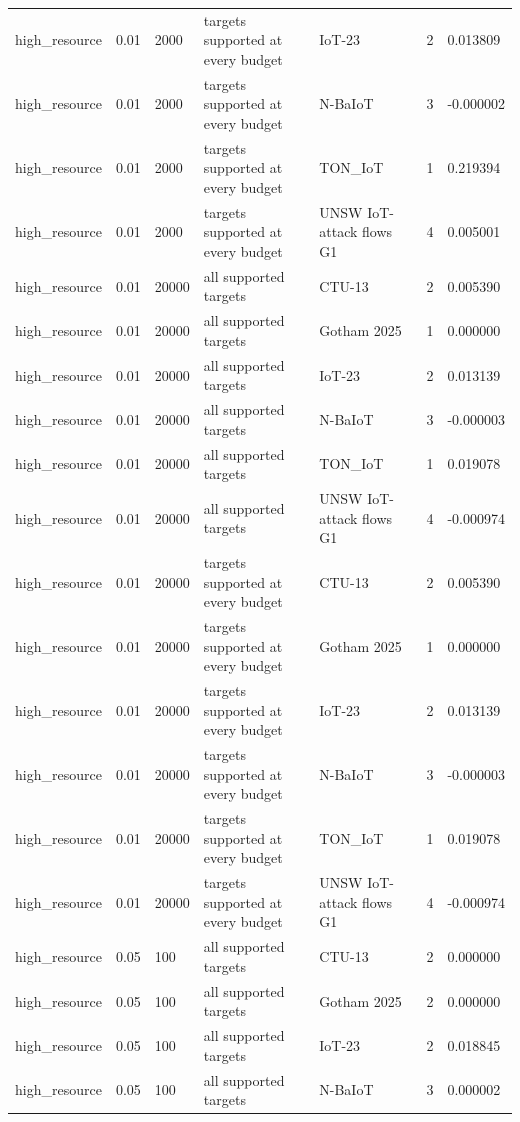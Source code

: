 \begin{tabular}{lllllll}
high\_resource & 0.01 & 2000 & targets supported at every budget & IoT-23 & 2 & 0.013809 \\
high\_resource & 0.01 & 2000 & targets supported at every budget & N-BaIoT & 3 & -0.000002 \\
high\_resource & 0.01 & 2000 & targets supported at every budget & TON\_IoT & 1 & 0.219394 \\
high\_resource & 0.01 & 2000 & targets supported at every budget & UNSW IoT-attack flows G1 & 4 & 0.005001 \\
high\_resource & 0.01 & 20000 & all supported targets & CTU-13 & 2 & 0.005390 \\
high\_resource & 0.01 & 20000 & all supported targets & Gotham 2025 & 1 & 0.000000 \\
high\_resource & 0.01 & 20000 & all supported targets & IoT-23 & 2 & 0.013139 \\
high\_resource & 0.01 & 20000 & all supported targets & N-BaIoT & 3 & -0.000003 \\
high\_resource & 0.01 & 20000 & all supported targets & TON\_IoT & 1 & 0.019078 \\
high\_resource & 0.01 & 20000 & all supported targets & UNSW IoT-attack flows G1 & 4 & -0.000974 \\
high\_resource & 0.01 & 20000 & targets supported at every budget & CTU-13 & 2 & 0.005390 \\
high\_resource & 0.01 & 20000 & targets supported at every budget & Gotham 2025 & 1 & 0.000000 \\
high\_resource & 0.01 & 20000 & targets supported at every budget & IoT-23 & 2 & 0.013139 \\
high\_resource & 0.01 & 20000 & targets supported at every budget & N-BaIoT & 3 & -0.000003 \\
high\_resource & 0.01 & 20000 & targets supported at every budget & TON\_IoT & 1 & 0.019078 \\
high\_resource & 0.01 & 20000 & targets supported at every budget & UNSW IoT-attack flows G1 & 4 & -0.000974 \\
high\_resource & 0.05 & 100 & all supported targets & CTU-13 & 2 & 0.000000 \\
high\_resource & 0.05 & 100 & all supported targets & Gotham 2025 & 2 & 0.000000 \\
high\_resource & 0.05 & 100 & all supported targets & IoT-23 & 2 & 0.018845 \\
high\_resource & 0.05 & 100 & all supported targets & N-BaIoT & 3 & 0.000002 \\

\end{tabular}

